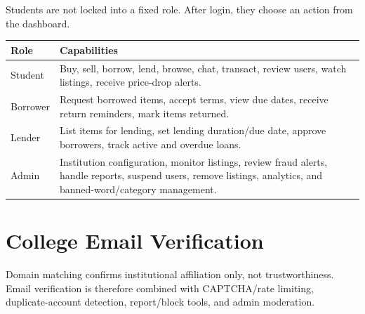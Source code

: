\documentclass[11pt,a4paper]{article}
\begin{document}
Students are not locked into a fixed role. After login, they choose an action from the dashboard.

\begin{table}[H]
\centering
\begin{tabularx}{\textwidth}{P{0.23\textwidth}Y}
\toprule
\textbf{Role} & \textbf{Capabilities}\\
\midrule
Student & Buy, sell, borrow, lend, browse, chat, transact, review users, watch listings, receive price-drop alerts.\\
Borrower & Request borrowed items, accept terms, view due dates, receive return reminders, mark items returned.\\
Lender & List items for lending, set lending duration/due date, approve borrowers, track active and overdue loans.\\
Admin & Institution configuration, monitor listings, review fraud alerts, handle reports, suspend users, remove listings, analytics, and banned-word/category management.\\
\bottomrule
\end{tabularx}
\end{table}

\section{College Email Verification}

\begin{center}
\end{center}

Domain matching confirms institutional affiliation only, not trustworthiness. Email verification is therefore combined with CAPTCHA/rate limiting, duplicate-account detection, report/block tools, and admin moderation.
\end{document}
